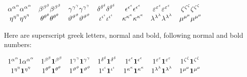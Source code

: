 \documentclass{article}
\begin{document}
$%
\begin{array}{ccccccc}
\alpha ^{\alpha ^\alpha }\mathbf{\alpha }^{\mathbf{\alpha }^{\mathbf{\alpha }%
}} & \beta ^{\beta ^\beta }\mathbf{\beta }^{\mathbf{\beta }^{\mathbf{\beta }%
}} & \gamma ^{\gamma ^\gamma }\mathbf{\gamma }^{\mathbf{\gamma }^{\mathbf{%
\gamma }}} & \delta ^{\delta ^\delta }\mathbf{\delta }^{\mathbf{\delta }^{%
\mathbf{\delta }}} & \epsilon ^{\epsilon ^\epsilon }\mathbf{\epsilon }^{%
\mathbf{\epsilon }^{\mathbf{\epsilon }}} & \varepsilon ^{\varepsilon
^\varepsilon }\mathbf{\varepsilon }^{\mathbf{\varepsilon }^{\mathbf{%
\varepsilon }}} & \zeta ^{\zeta ^\zeta }\mathbf{\zeta }^{\mathbf{\zeta }^{%
\mathbf{\zeta }}} \\ 
\eta ^{\eta ^\eta }\mathbf{\eta }^{\mathbf{\eta }^{\mathbf{\eta }}} & \theta
^{\theta ^\theta }\mathbf{\theta }^{\mathbf{\theta }^{\mathbf{\theta }}} & 
\vartheta ^{\vartheta ^\vartheta }\mathbf{\vartheta }^{\mathbf{\vartheta }^{%
\mathbf{\vartheta }}} & \iota ^{\iota ^\iota }\mathbf{\iota }^{\mathbf{\iota 
}^{\mathbf{\iota }}} & \kappa ^{\kappa ^\kappa }\mathbf{\kappa }^{\mathbf{%
\kappa }^{\mathbf{\kappa }}} & \lambda ^{\lambda ^\lambda }\mathbf{\lambda }%
^{\mathbf{\lambda }^{\mathbf{\lambda }}} & \mu ^{\mu ^\mu }\mathbf{\mu }^{%
\mathbf{\mu }^{\mathbf{\mu }}}%
\end{array}
$

Here are superscript greek letters, normal and bold, following normal and
bold numbers:

$%
\begin{array}{ccccccc}
1^{\alpha ^{\alpha }}1\mathbf{\alpha }^{\mathbf{\alpha }^{\mathbf{\alpha }}}
& 1^{\beta ^{\beta }}\mathbf{1}^{\mathbf{\beta }^{\mathbf{\beta }}} & 
1^{\gamma ^{\gamma }}\mathbf{1}^{\mathbf{\gamma }^{\mathbf{\gamma }}} & 
1^{\delta ^{\delta }}\mathbf{1}^{\mathbf{\delta }^{\mathbf{\delta }}} & 
1^{\epsilon ^{\epsilon }}\mathbf{1}^{\mathbf{\epsilon }^{\mathbf{\epsilon }}}
& 1^{\varepsilon ^{\varepsilon }}\mathbf{1}^{\mathbf{\varepsilon }^{\mathbf{%
\varepsilon }}} & 1^{\zeta ^{\zeta }}\mathbf{1}^{\mathbf{\zeta }^{\mathbf{%
\zeta }}} \\ 
1^{\eta ^{\eta }}\mathbf{1}^{\mathbf{\eta }^{\mathbf{\eta }}} & 1^{\theta
^{\theta }}\mathbf{1}^{\mathbf{\theta }^{\mathbf{\theta }}} & 1^{\vartheta
^{\vartheta }}\mathbf{1}^{\mathbf{\vartheta }^{\mathbf{\vartheta }}} & 
1^{\iota ^{\iota }}\mathbf{1}^{\mathbf{\iota }^{\mathbf{\iota }}} & 
1^{\kappa ^{\kappa }}\mathbf{1}^{\mathbf{\kappa }^{\mathbf{\kappa }}} & 
1^{\lambda ^{\lambda }}\mathbf{1}^{\mathbf{\lambda }^{\mathbf{\lambda }}} & 
1^{\mu ^{\mu }}\mathbf{1}^{\mathbf{\mu }^{\mathbf{\mu }}}%
\end{array}
$
\end{document}
